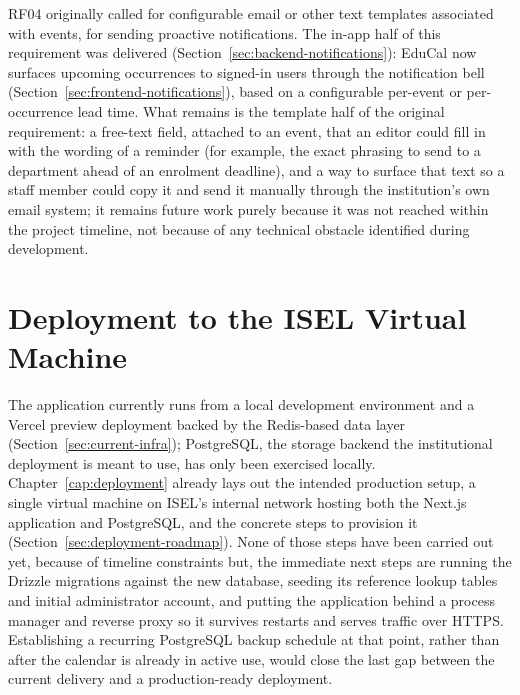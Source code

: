 RF04 originally called for configurable email or other text templates associated with events, for sending proactive notifications. The in-app half of this requirement was delivered (Section~\ref{sec:backend-notifications}): EduCal now surfaces upcoming occurrences to signed-in users through the notification bell (Section~\ref{sec:frontend-notifications}), based on a configurable per-event or per-occurrence lead time. What remains is the template half of the original requirement: a free-text field, attached to an event, that an editor could fill in with the wording of a reminder (for example, the exact phrasing to send to a department ahead of an enrolment deadline), and a way to surface that text so a staff member could copy it and send it manually through the institution's own email system; it remains future work purely because it was not reached within the project timeline, not because of any technical obstacle identified during development.

\section{Deployment to the ISEL Virtual Machine} \label{sec:future-deployment}

The application currently runs from a local development environment and a Vercel preview deployment backed by the Redis-based data layer (Section~\ref{sec:current-infra}); PostgreSQL, the storage backend the institutional deployment is meant to use, has only been exercised locally. Chapter~\ref{cap:deployment} already lays out the intended production setup, a single virtual machine on ISEL's internal network hosting both the Next.js application and PostgreSQL, and the concrete steps to provision it (Section~\ref{sec:deployment-roadmap}). None of those steps have been carried out yet, because of timeline constraints but, the immediate next steps are running the Drizzle migrations against the new database, seeding its reference lookup tables and initial administrator account, and putting the application behind a process manager and reverse proxy so it survives restarts and serves traffic over HTTPS. Establishing a recurring PostgreSQL backup schedule at that point, rather than after the calendar is already in active use, would close the last gap between the current delivery and a production-ready deployment.
